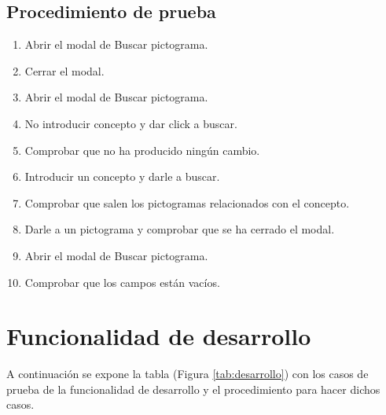 \subsection{Procedimiento de prueba}
\label{procedimientoPruebas:busPicto}
\begin{enumerate}
    \item Abrir el modal de Buscar pictograma.
    \item Cerrar el modal.
    \item Abrir el modal de Buscar pictograma.
    \item No introducir concepto y dar click a buscar.
    \item Comprobar que no ha producido ningún cambio.
    \item Introducir un concepto y darle a buscar.
    \item Comprobar que salen los pictogramas relacionados con el concepto.
    \item Darle a un pictograma y comprobar que se ha cerrado el modal.
    \item Abrir el modal de Buscar pictograma.
    \item Comprobar que los campos están vacíos.

\end{enumerate}

\section{Funcionalidad de desarrollo}
\label{planPruebas:desarrollo}
A continuación se expone la tabla (Figura \ref{tab:desarrollo}) con los casos de prueba de la funcionalidad de desarrollo y el procedimiento para hacer dichos casos.


